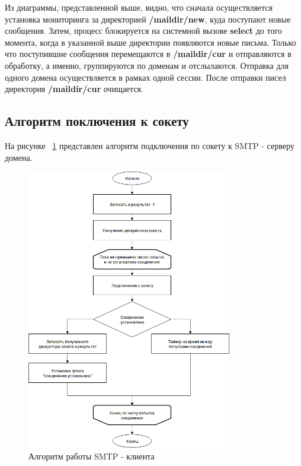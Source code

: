 \documentclass[a4paper,12pt]{article}
\begin{document}
Из диаграммы, представленной выше, видно, что сначала осуществляется установка мониторинга за директорией \textbf{/maildir/new}, куда
поступают новые сообщения. Затем, процесс блокируется на системной вызове \textbf{select} до того момента, когда в указанной выше директории
появляются новые письма. Только что поступившие сообщения перемещаются в \textbf{/maildir/cur} и отправляются в обработку, а именно,
группируются по доменам и отслылаются. Отправка для одного домена осуществляется в рамках одной сессии. После отправки писел директория \textbf{/maildir/cur} очищается.

\subsection{Алгоритм поключения к сокету}

На рисунке ~\ref{fig:connect_alg} представлен алгоритм подключения по сокету к SMTP - серверу домена.

\begin{figure}[h]
\centering
\includegraphics[width=0.8\textwidth]{includes/connect_alg.png}
\caption{Алгоритм работы SMTP - клиента}
\label{fig:connect_alg}
\end{figure}
\end{document}
